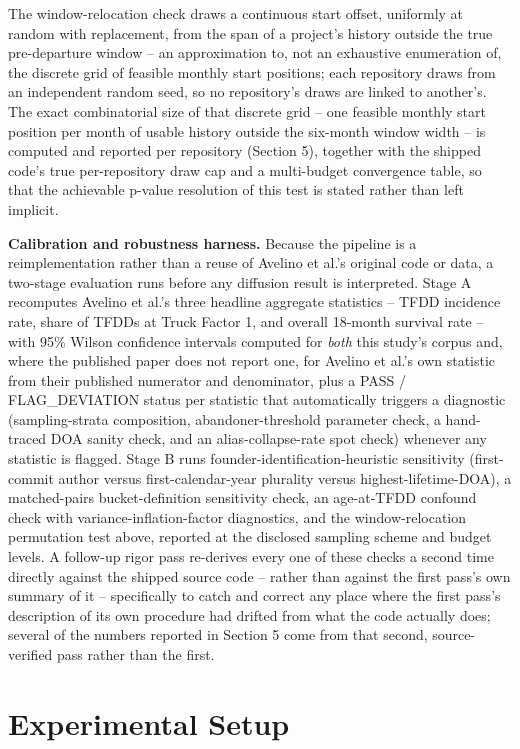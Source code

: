 \documentclass[11pt,letterpaper]{article}
\begin{document}
The window-relocation check draws a continuous start offset, uniformly at random with replacement, from the span of a project's history outside the true pre-departure window -- an approximation to, not an exhaustive enumeration of, the discrete grid of feasible monthly start positions; each repository draws from an independent random seed, so no repository's draws are linked to another's. The exact combinatorial size of that discrete grid -- one feasible monthly start position per month of usable history outside the six-month window width -- is computed and reported per repository (Section 5), together with the shipped code's true per-repository draw cap and a multi-budget convergence table, so that the achievable p-value resolution of this test is stated rather than left implicit.

\textbf{Calibration and robustness harness.} Because the pipeline is a reimplementation rather than a reuse of Avelino et al.'s original code or data, a two-stage evaluation runs before any diffusion result is interpreted. Stage A recomputes Avelino et al.'s three headline aggregate statistics -- TFDD incidence rate, share of TFDDs at Truck Factor 1, and overall 18-month survival rate -- with 95\% Wilson confidence intervals computed for \emph{both} this study's corpus and, where the published paper does not report one, for Avelino et al.'s own statistic from their published numerator and denominator, plus a PASS / FLAG\_DEVIATION status per statistic that automatically triggers a diagnostic (sampling-strata composition, abandoner-threshold parameter check, a hand-traced DOA sanity check, and an alias-collapse-rate spot check) whenever any statistic is flagged. Stage B runs founder-identification-heuristic sensitivity (first-commit author versus first-calendar-year plurality versus highest-lifetime-DOA), a matched-pairs bucket-definition sensitivity check, an age-at-TFDD confound check with variance-inflation-factor diagnostics, and the window-relocation permutation test above, reported at the disclosed sampling scheme and budget levels. A follow-up rigor pass re-derives every one of these checks a second time directly against the shipped source code -- rather than against the first pass's own summary of it -- specifically to catch and correct any place where the first pass's description of its own procedure had drifted from what the code actually does; several of the numbers reported in Section 5 come from that second, source-verified pass rather than the first.

\section{Experimental Setup}
\end{document}
